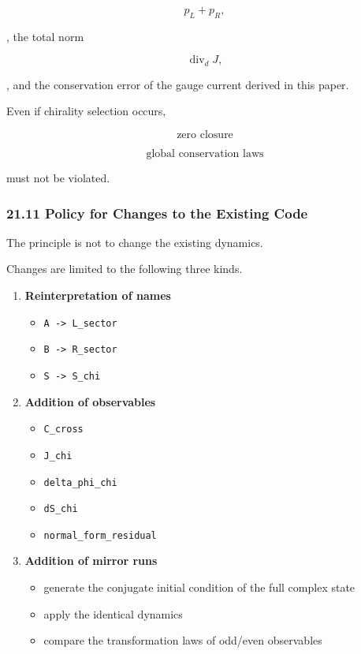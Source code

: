 \documentclass[
  a4paper,
]{article}
\providecommand{\tightlist}{%
  \setlength{\itemsep}{0pt}\setlength{\parskip}{0pt}}
\begin{document}
\[
p_L+p_R,
\]

, the total norm

\[
\operatorname{div}_dJ,
\]

, and the conservation error of the gauge current derived in this paper.

Even if chirality selection occurs,

\[
\boxed{
\text{zero closure}
}
\]

\[
\boxed{
\text{global conservation laws}
}
\]

must not be violated.

\subsubsection{21.11 Policy for Changes to the Existing
Code}\label{policy-for-changes-to-the-existing-code}

The principle is not to change the existing dynamics.

Changes are limited to the following three kinds.

\begin{enumerate}
\def\labelenumi{\arabic{enumi}.}
\tightlist
\item
  \textbf{Reinterpretation of names}

  \begin{itemize}
  \tightlist
  \item
    \texttt{A\ -\textgreater{}\ L\_sector}
  \item
    \texttt{B\ -\textgreater{}\ R\_sector}
  \item
    \texttt{S\ -\textgreater{}\ S\_chi}
  \end{itemize}
\item
  \textbf{Addition of observables}

  \begin{itemize}
  \tightlist
  \item
    \texttt{C\_cross}
  \item
    \texttt{J\_chi}
  \item
    \texttt{delta\_phi\_chi}
  \item
    \texttt{dS\_chi}
  \item
    \texttt{normal\_form\_residual}
  \end{itemize}
\item
  \textbf{Addition of mirror runs}

  \begin{itemize}
  \tightlist
  \item
    generate the conjugate initial condition of the full complex state
  \item
    apply the identical dynamics
  \item
    compare the transformation laws of odd/even observables
  \end{itemize}
\end{enumerate}
\end{document}
